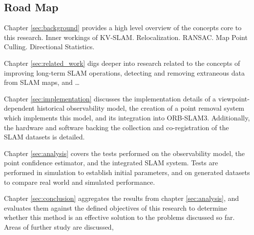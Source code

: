 \subsection{Road Map}

Chapter \ref{sec:background} provides a high level overview of the concepts core to this research. Inner workings of KV-SLAM. Relocalization. RANSAC. Map Point Culling. Directional Statistics.

Chapter \ref{sec:related_work} digs deeper into research related to the concepts of improving long-term SLAM operations, detecting and removing extraneous data from SLAM maps, and \dots

Chapter \ref{sec:implementation} discusses the implementation details of a viewpoint-dependent historical observability model, the creation of a point removal system which implements this model, and its integration into ORB-SLAM3. Additionally, the hardware and software backing the collection and co-registration of the SLAM datasets is detailed.

Chapter \ref{sec:analysis} covers the tests performed on the observability model, the point confidence estimator, and the integrated SLAM system. Tests are performed in simulation to establish initial parameters, and on generated datasets to compare real world and simulated performance.

Chapter \ref{sec:conclusion} aggregates the results from chapter \ref{sec:analysis}, and evaluates them against the defined objectives of this research to determine whether this method is an effective solution to the problems discussed so far. Areas of further study are discussed, 